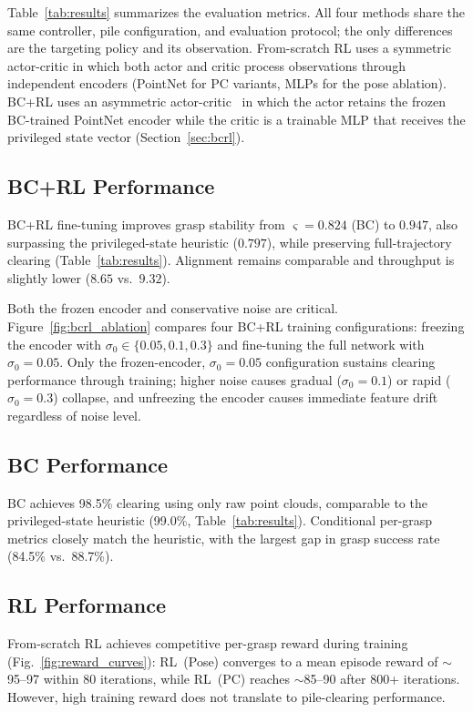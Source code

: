 \documentclass[letterpaper, 10 pt, conference]{ieeeconf}
\begin{document}
Table~\ref{tab:results} summarizes the evaluation metrics.
All four methods share the same controller, pile configuration, and evaluation protocol; the only differences are the targeting policy and its observation.
From-scratch RL uses a symmetric actor-critic in which both actor and critic process observations through independent encoders (PointNet for PC variants, MLPs for the pose ablation).
BC+RL uses an asymmetric actor-critic~\cite{pinto2018asymmetric} in which the actor retains the frozen BC-trained PointNet encoder while the critic is a trainable MLP that receives the privileged state vector (Section~\ref{sec:bcrl}).

\subsection{BC+RL Performance}
\label{sec:bcrl_perf}
BC+RL fine-tuning improves grasp stability from $\varsigma = 0.824$ (BC) to $0.947$, also surpassing the privileged-state heuristic ($0.797$), while preserving full-trajectory clearing (Table~\ref{tab:results}).
Alignment remains comparable and throughput is slightly lower ($8.65$ vs.\ $9.32$).

Both the frozen encoder and conservative noise are critical.
Figure~\ref{fig:bcrl_ablation} compares four BC+RL training configurations: freezing the encoder with $\sigma_0 \in \{0.05, 0.1, 0.3\}$ and fine-tuning the full network with $\sigma_0 = 0.05$.
Only the frozen-encoder, $\sigma_0 = 0.05$ configuration sustains clearing performance through training; higher noise causes gradual ($\sigma_0 = 0.1$) or rapid ($\sigma_0 = 0.3$) collapse, and unfreezing the encoder causes immediate feature drift regardless of noise level.

\subsection{BC Performance}
\label{sec:bc_perf}
BC achieves 98.5\% clearing using only raw point clouds, comparable to the privileged-state heuristic (99.0\%, Table~\ref{tab:results}).
Conditional per-grasp metrics closely match the heuristic, with the largest gap in grasp success rate (84.5\% vs.\ 88.7\%).

\subsection{RL Performance}
\label{sec:rl_perf}
From-scratch RL achieves competitive per-grasp reward during training (Fig.~\ref{fig:reward_curves}): RL~(Pose) converges to a mean episode reward of $\sim$95--97 within 80 iterations, while RL~(PC) reaches $\sim$85--90 after 800+ iterations.
However, high training reward does not translate to pile-clearing performance.
\end{document}
